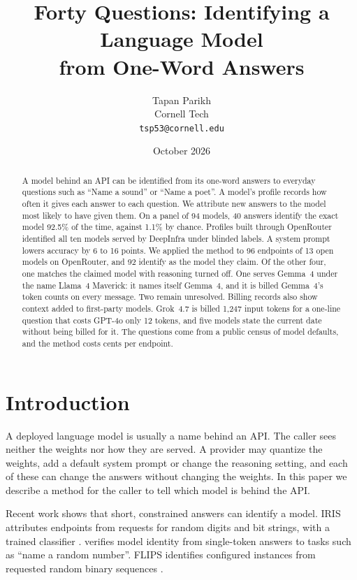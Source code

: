 \documentclass[11pt]{article}
\title{\textbf{Forty Questions: Identifying a Language Model\\from One-Word Answers}}
\author{Tapan Parikh\\Cornell Tech\\\texttt{tsp53@cornell.edu}}
\date{October 2026}
\begin{document}
\maketitle

\begin{abstract}
\noindent
A model behind an API can be identified from its one-word answers to everyday questions such as
``Name a sound'' or ``Name a poet''. A model's profile records how often it gives each answer to each
question. We attribute new answers to the model most likely to have given
them. On a panel of 94
models, 40 answers identify the exact model 92.5\% of the time, against 1.1\% by chance. Profiles
built through OpenRouter identified all ten models served by DeepInfra under blinded labels. A 
system prompt lowers accuracy by 6 to 16 points. We applied the method to 96 endpoints of 13 open
models on OpenRouter, and 92 identify as the model they claim. Of the other four, one matches the
claimed model with reasoning turned off. One serves Gemma~4 under the name Llama~4 Maverick: it
names itself Gemma~4, and it is billed Gemma~4's token counts on every message. Two remain
unresolved. Billing records also show
context added to first-party models. Grok~4.7 is billed 1,247 input tokens for a one-line
question that costs GPT-4o only 12 tokens, and five models state the current date without being billed for
it. The questions come from a public census of model defaults, and the method costs cents per
endpoint.
\end{abstract}

\section{Introduction}
\label{sec:intro}

A deployed language model is usually a name behind an API. The caller sees neither the weights
nor how they are served. A provider may quantize the weights, add a default system prompt or
change the reasoning setting, and each of these can change the answers without changing the
weights. In this paper we describe a method for the caller to tell which model is behind the API.

Recent work shows that short, constrained answers can identify a model. IRIS attributes endpoints
from requests for random digits and bit strings, with a trained classifier \citep{zhang2026iris}.
\citet{bruckner2026onetoken} verifies model identity from single-token answers to tasks such as
``name a random number''. FLIPS identifies configured instances from requested random binary
sequences \citep{richardeau2026flips}.
\end{document}
